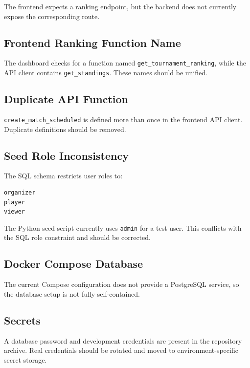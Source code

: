 \documentclass[12pt,a4paper]{article}
\begin{document}
The frontend expects a ranking endpoint, but the backend does not
currently expose the corresponding route.

\subsection{Frontend Ranking Function Name}

The dashboard checks for a function named
\texttt{get\_tournament\_ranking}, while the API client contains
\texttt{get\_standings}. These names should be unified.

\subsection{Duplicate API Function}

\texttt{create\_match\_scheduled} is defined more than once in the
frontend API client. Duplicate definitions should be removed.

\subsection{Seed Role Inconsistency}

The SQL schema restricts user roles to:

\begin{lstlisting}
organizer
player
viewer
\end{lstlisting}

The Python seed script currently uses \texttt{admin} for a test user.
This conflicts with the SQL role constraint and should be corrected.

\subsection{Docker Compose Database}

The current Compose configuration does not provide a PostgreSQL
service, so the database setup is not fully self-contained.

\subsection{Secrets}

A database password and development credentials are present in the
repository archive. Real credentials should be rotated and moved to
environment-specific secret storage.

\end{document}
